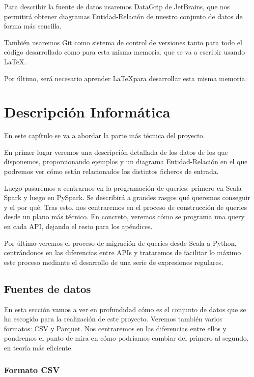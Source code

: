 \documentclass[12pt,twoside,titlepage]{report}
\begin{document}
Para describir la fuente de datos usaremos DataGrip de JetBrains, que nos permitirá obtener diagramas Entidad-Relación de nuestro conjunto de datos de forma más sencilla.

También usaremos Git como sistema de control de versiones tanto para todo el código desarrollado como para esta misma memoria, que se va a escribir usando \LaTeX.

Por último, será necesario aprender \LaTeX para desarrollar esta misma memoria.



\chapter{Descripción Informática}
\label{chap:contenidos}
\newpage

En este capítulo se va a abordar la parte más técnica del proyecto. 

En primer lugar veremos una descripción detallada de los datos de los que disponemos, proporcionando ejemplos y un diagrama Entidad-Relación en el que podremos ver cómo están relacionados los distintos ficheros de entrada.

Luego pasaremos a centrarnos en la programación de queries: primero en Scala Spark y luego en PySpark. Se describirá a grandes rasgos qué queremos conseguir y el por qué. Tras esto, nos centraremos en el proceso de construcción de queries desde un plano más técnico. En concreto, veremos cómo se programa una query en cada API, dejando el resto para los apéndices.

Por último veremos el proceso de migración de queries desde Scala a Python, centrándonos en las diferencias entre APIs y trataremos de facilitar lo máximo este proceso mediante el desarrollo de una serie de expresiones regulares.

\section{Fuentes de datos}

En esta sección vamos a ver en profundidad cómo es el conjunto de datos que se ha escogido para la realización de este proyecto. Veremos también varios formatos: CSV y Parquet. Nos centraremos en las diferencias entre ellos y pondremos el punto de mira en cómo podríamos cambiar del primero al segundo, en teoría más eficiente.

\subsection{Formato CSV}
\end{document}
